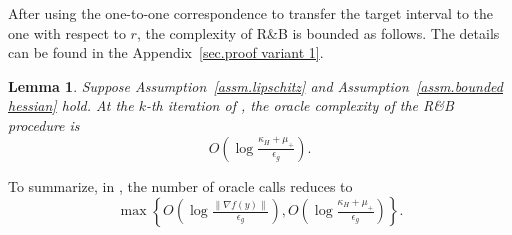 \documentclass{article}
\newtheorem{lemma}[theorem]{Lemma}
\numberwithin{equation}{section}
\numberwithin{equation}{section}
\begin{document}
After using the one-to-one correspondence to transfer the target interval to the one with respect to $r$, the complexity of R\&B is bounded as follows. The details can be found in the Appendix~\ref{sec.proof variant 1}.
\begin{lemma}
    \label{lem.bound initial interval}
    Suppose Assumption~\ref{assm.lipschitz} and Assumption~\ref{assm.bounded hessian} hold. At the $k$-th iteration of , the oracle complexity of the R\&B procedure is
    \begin{equation}
        \label{eq.complexity bisection}
        O\left(\log\tfrac{\kappa_H+\mu_+}{\epsilon_g}\right).
    \end{equation}
\end{lemma}
To summarize, in , the number of oracle calls  reduces to
\begin{equation*}
    \max\left\{O\left(\log \tfrac{\|\nabla f(y)\|}{\epsilon_g}\right),
    O\left(\log\tfrac{\kappa_H+\mu_+}{\epsilon_g}\right)
    \right\}.
\end{equation*}
\end{document}
